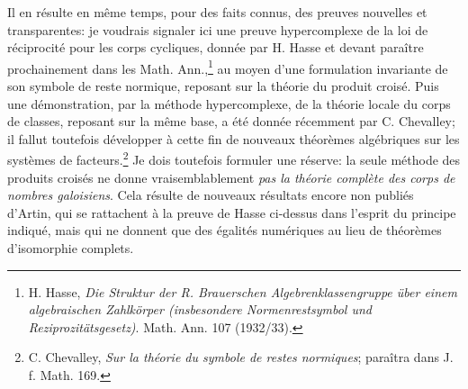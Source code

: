 Il en résulte en même temps, pour des faits connus, des preuves nouvelles et transparentes: je voudrais signaler ici une preuve hypercomplexe de la loi de réciprocité pour les corps cycliques, donnée par H. Hasse et devant paraître prochainement dans les Math. Ann.,\footnote{H. Hasse, \emph{Die Struktur der R. Brauerschen Algebrenklassengruppe über einem algebraischen Zahlkörper (insbesondere Normenrestsymbol und Reziprozitätsgesetz)}. Math. Ann. 107 (1932/33).} au moyen d'une formulation invariante de son symbole de reste normique, reposant sur la théorie du produit croisé. Puis une démonstration, par la méthode hypercomplexe, de la théorie locale du corps de classes, reposant sur la même base, a été donnée récemment par C. Chevalley; il fallut toutefois développer à cette fin de nouveaux théorèmes algébriques sur les systèmes de facteurs.\footnote{C. Chevalley, \emph{Sur la théorie du symbole de restes normiques}; paraîtra dans J. f. Math. 169.} Je dois toutefois formuler une réserve: la seule méthode des produits croisés ne donne vraisemblablement \emph{pas la théorie complète des corps de nombres galoisiens}. Cela résulte de nouveaux résultats encore non publiés d'Artin, qui se rattachent à la preuve de Hasse ci-dessus dans l'esprit du principe indiqué, mais qui ne donnent que des égalités numériques au lieu de théorèmes d'isomorphie complets.


